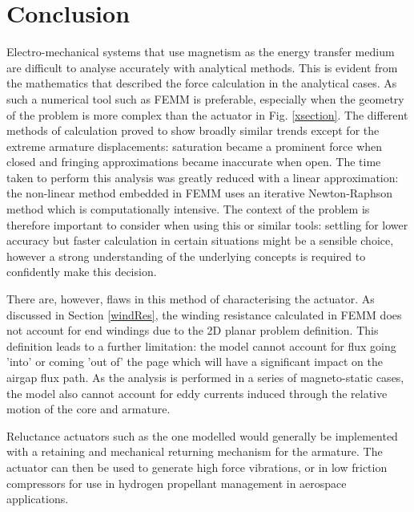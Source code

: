 \documentclass[a4paper]{IEEEtran}
\begin{document}
\section{Conclusion}
Electro-mechanical systems that use magnetism as the energy transfer medium are difficult to analyse accurately with analytical methods. This is evident from the mathematics that described the force calculation in the analytical cases. As such a numerical tool such as FEMM is preferable, especially when the geometry of the problem is more complex than the actuator in Fig. \ref{xsection}. The different methods of calculation proved to show broadly similar trends except for the extreme armature displacements: saturation became a prominent force when closed and fringing approximations became inaccurate when open. The time taken to perform this analysis was greatly reduced with a linear approximation: the non-linear method embedded in FEMM uses an iterative Newton-Raphson method which is computationally intensive. The context of the problem is therefore important to consider when using this or similar tools: settling for lower accuracy but faster calculation in certain situations might be a sensible choice, however a strong understanding of the underlying concepts is required to confidently make this decision.

There are, however, flaws in this method of characterising the actuator. As discussed in Section \ref{windRes}, the winding resistance calculated in FEMM does not account for end windings due to the 2D planar problem definition. This definition leads to a further limitation: the model cannot account for flux going 'into' or coming 'out of' the page which will have a significant impact on the airgap flux path. As the analysis is performed in a series of magneto-static cases, the model also cannot account for eddy currents induced through the relative motion of the core and armature.

Reluctance actuators such as the one modelled would generally be implemented with a retaining and mechanical returning mechanism for the armature. The actuator can then be used to generate high force vibrations, or in low friction compressors \cite{menerouddesign} for use in hydrogen propellant management in aerospace applications.

\printbibliography

% 

% 
 
% 
\end{document}
